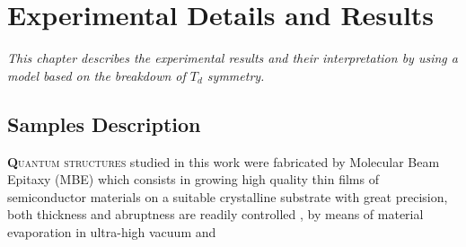 \chapter{Experimental Details and Results}
\label{chap:experimentals-details-and-results}
\textit{This chapter describes the experimental results and their interpretation by using a model based on the breakdown of $T_d$ symmetry.}
\vfill
\minitoc
\newpage

\section{Samples Description}
\label{sec:chapter-3-section-samples-description}
\vspace{-10mm}
\lettrine[lines=3, lraise=.1, nindent=0mm, slope=0mm]{\textbf{Q}}{uantum structures} 
studied in this work were fabricated by Molecular Beam Epitaxy (MBE) which consists in growing high quality thin films of semiconductor materials on a suitable crystalline substrate  with great precision, both thickness and abruptness are readily controlled \cite{orton2015molecular}, by means of material evaporation in ultra-high vacuum and 
